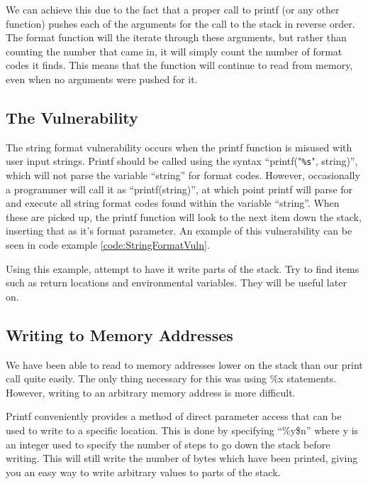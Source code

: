 \documentclass[a4paper,11pt]{report}
\begin{document}
		We can achieve this due to the fact that a proper call to printf (or any other function) pushes each of the arguments for the call to the stack in reverse order. 
		The format function will the iterate through these arguments, but rather than counting the number that came in, it will simply count the number of format codes it finds. 
		This means that the function will continue to read from memory, even when no arguments were pushed for it. 
		\subsection{The Vulnerability}
			The string format vulnerability occurs when the printf function is misused with user input strings. 
			Printf should be called using the syntax ``printf("\verb+%s+", string)'', which will not parse the variable ``string'' for format codes. 
			However, occasionally a programmer will call it as ``printf(string)'', at which point printf will parse for and execute all string format codes found within the variable ``string''. 
			When these are picked up, the printf function will look to the next item down the stack, inserting that as it's format parameter. 
			An example of this vulnerability can be seen in code example \ref{code:StringFormatVuln}.
			\begin{code}
				C}]{./StringFormatVuln.c}
				\caption{Example of the String Format Vulnerability in Code}
				\label{code:StringFormatVuln}
			\end{code}
			Using this example, attempt to have it write parts of the stack. 
			Try to find items such as return locations and environmental variables. 
			They will be useful later on. 

		\subsection{Writing to Memory Addresses}
			We have been able to read to memory addresses lower on the stack than our print call quite easily. 
			The only thing necessary for this was using \%x statements. 
			However, writing to an arbitrary memory address is more difficult. 

			Printf conveniently provides a method of direct parameter access that can be used to write to a specific location. 
			This is done by specifying ``\%y\$n'' where y is an integer used to specify the number of steps to go down the stack before writing. 
			This will still write the number of bytes which have been printed, giving you an easy way to write arbitrary values to parts of the stack. 
			
\end{document}
